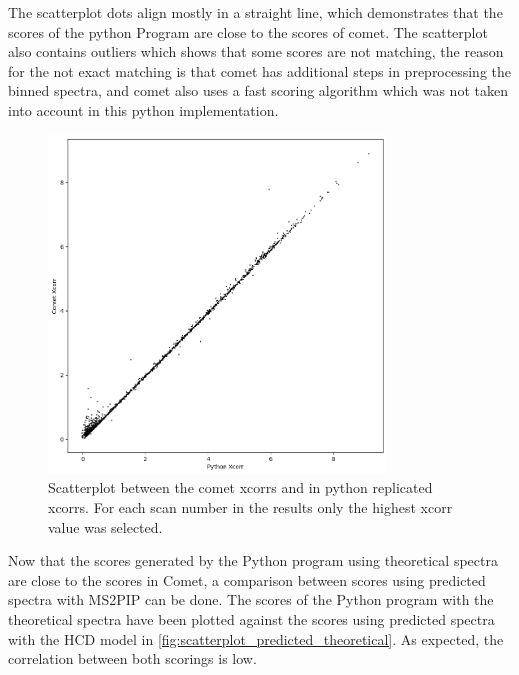 \documentclass[11pt]{article}
\begin{document}
The scatterplot dots align mostly in a straight line, which demonstrates that the scores of the python Program are close to the scores of comet. The scatterplot also contains outliers which shows that some scores are not matching, the reason for the not exact matching is that comet has additional steps in preprocessing the binned spectra, and comet also uses a fast scoring algorithm which was not taken into account in this python implementation. 
\begin{figure}[ht]
\centering
\includegraphics[width=0.8\textwidth]{figs/scatterplot.png}
\caption{Scatterplot between the comet xcorrs and in python replicated xcorrs. For each scan number in the results only the highest xcorr value was selected.}
\label{fig:scatterplot}
\end{figure}

Now that the scores generated by the Python program using theoretical spectra are close to the scores in Comet, a comparison between scores using predicted spectra with MS2PIP can be done. The scores of the Python program with the theoretical spectra have been plotted against the scores using predicted spectra with the HCD model in \cref{fig:scatterplot_predicted_theoretical}. As expected, the correlation between both scorings is low. 
\end{document}
